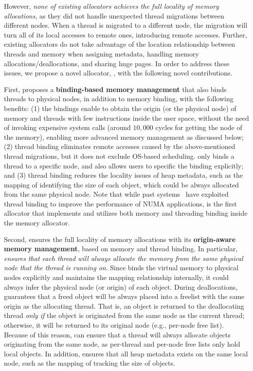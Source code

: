 However, \textit{none of existing allocators achieves the full locality of memory allocations}, as they did not handle unexpected thread migrations between different nodes. When a thread is migrated to a different node, the migration will turn all of its local accesses to remote ones, introducing remote accesses. Further, existing allocators do not take advantage of the location relationship between threads and memory when assigning metadata, handling memory allocations/deallocations, and sharing huge pages. In order to address these issues, we propose a novel allocator, \NM{}, with the following novel contributions.  


First, \NM{} proposes a \textbf{binding-based memory management} that also binds threads to physical nodes, in addition to memory binding, with the following benefits: (1) the bindings enable \NM{} to obtain the origin (or the physical node) of memory and threads with few instructions inside the user space, without the need of invoking expensive system calls (around  $10,000$ cycles for getting the node of the memory), enabling more advanced memory management as discussed below; %
(2) thread binding eliminates remote accesses caused by the above-mentioned thread migrations, but it does not exclude OS-based scheduling. \NM{} only binds a thread to a specific node, and also allows users to specific the binding explicitly; and (3) thread binding reduces the locality issues of heap metadata, such as the mapping of identifying the size of each object, which could be always allocated from the same physical node. Note that while past systems~\cite{li2013numa, XuNuma, Lepers:2015:TMP:2813767.2813788} have exploited thread binding to improve the performance of NUMA applications, \NM{} is the first allocator that implements and utilizes both memory and threading binding inside the memory allocator. 

Second, \NM{} ensures the full locality of memory allocations with its \textbf{origin-aware memory management}, based on memory and thread binding. In particular, \textit{\NM{} ensures that each thread will always allocate the memory from the same physical node that the thread is running on}. Since \NM{} binds the virtual memory to physical nodes explicitly and maintains the mapping relationship internally, it could always infer the physical node (or origin) of each object. During deallocations, \NM{} guarantees that a freed object will be always placed into a freelist with the same origin as the allocating thread. That is, an object is returned to the deallocating thread \textit{only if} the object is originated from the same node as the current thread; otherwise, it will be returned to its original node (e.g., per-node free list). Because of this reason, \NM{} can ensure that a thread will always allocate objects originating from the same node, as per-thread and per-node free lists only hold local objects. In addition, \NM{} ensures that all heap metadata exists on the same local node, such as the mapping of tracking the size of objects.




